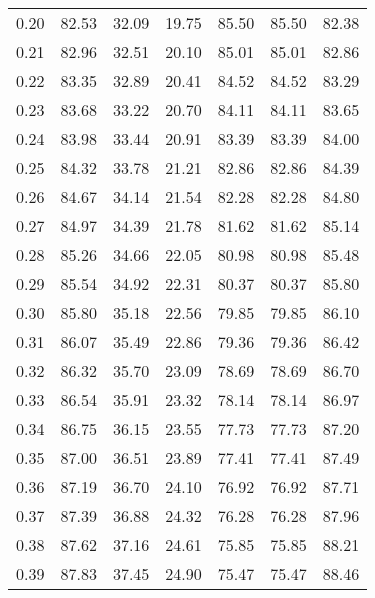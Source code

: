\begin{tabular}{|c|c|c|c|c|c|c|}
      0.20 &     82.53 &     32.09 &      19.75 &   85.50 &      85.50 &         82.38 \\
      0.21 &     82.96 &     32.51 &      20.10 &   85.01 &      85.01 &         82.86 \\
      0.22 &     83.35 &     32.89 &      20.41 &   84.52 &      84.52 &         83.29 \\
      0.23 &     83.68 &     33.22 &      20.70 &   84.11 &      84.11 &         83.65 \\
      0.24 &     83.98 &     33.44 &      20.91 &   83.39 &      83.39 &         84.00 \\
      0.25 &     84.32 &     33.78 &      21.21 &   82.86 &      82.86 &         84.39 \\
      0.26 &     84.67 &     34.14 &      21.54 &   82.28 &      82.28 &         84.80 \\
      0.27 &     84.97 &     34.39 &      21.78 &   81.62 &      81.62 &         85.14 \\
      0.28 &     85.26 &     34.66 &      22.05 &   80.98 &      80.98 &         85.48 \\
      0.29 &     85.54 &     34.92 &      22.31 &   80.37 &      80.37 &         85.80 \\
      0.30 &     85.80 &     35.18 &      22.56 &   79.85 &      79.85 &         86.10 \\
      0.31 &     86.07 &     35.49 &      22.86 &   79.36 &      79.36 &         86.42 \\
      0.32 &     86.32 &     35.70 &      23.09 &   78.69 &      78.69 &         86.70 \\
      0.33 &     86.54 &     35.91 &      23.32 &   78.14 &      78.14 &         86.97 \\
      0.34 &     86.75 &     36.15 &      23.55 &   77.73 &      77.73 &         87.20 \\
      0.35 &     87.00 &     36.51 &      23.89 &   77.41 &      77.41 &         87.49 \\
      0.36 &     87.19 &     36.70 &      24.10 &   76.92 &      76.92 &         87.71 \\
      0.37 &     87.39 &     36.88 &      24.32 &   76.28 &      76.28 &         87.96 \\
      0.38 &     87.62 &     37.16 &      24.61 &   75.85 &      75.85 &         88.21 \\
      0.39 &     87.83 &     37.45 &      24.90 &   75.47 &      75.47 &         88.46 \\

\end{tabular}
